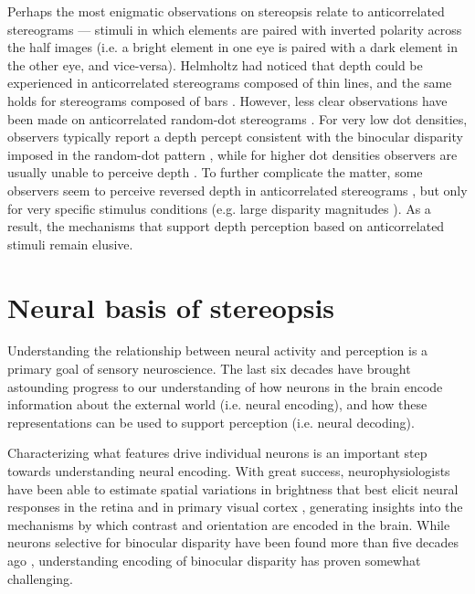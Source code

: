 Perhaps the most enigmatic observations on stereopsis relate to anticorrelated stereograms --- stimuli in which elements are paired with inverted polarity across the half images (i.e. a bright element in one eye is paired with a dark element in the other eye, and vice-versa). Helmholtz had noticed that depth could be experienced in anticorrelated stereograms composed of thin lines, and the same holds for stereograms composed of bars \cite{Cumming:1998ib}. However, less clear observations have been made on anticorrelated random-dot stereograms \cite{Cogan:1993yr, Cumming:1998ib, Tanabe:2008gx, Doi:2011ku, Hibbard2014}. For very low dot densities, observers typically report a depth percept consistent with the binocular disparity imposed in the random-dot pattern \cite{Cogan:1993yr, Cumming:1998ib}, while for higher dot densities observers are usually unable to perceive depth \cite{JULESZ:1964ff, Hibbard2014}. To further complicate the matter, some observers seem to perceive reversed depth in anticorrelated stereograms \cite{Tanabe:2008gx, Doi:2011ku,Read:2000kx}, but only for very specific stimulus conditions (e.g. large disparity magnitudes \cite{Doi:2011ku}). As a result, the mechanisms that support depth perception based on anticorrelated stimuli remain elusive.


\section{Neural basis of stereopsis}  

Understanding the relationship between neural activity and perception is a primary goal of sensory neuroscience. The last six decades have brought astounding progress to our understanding of how neurons in the brain encode information about the external world (i.e. neural encoding), and how these representations can be used to support perception (i.e. neural decoding). 

Characterizing what features drive individual neurons is an important step towards understanding neural encoding. With great success, neurophysiologists have been able to estimate spatial variations in brightness that best elicit neural responses in the retina \cite{Lettvin:1959gs,Levick:1967fk,Barlow:1972bh} and in primary visual cortex \cite{HUBEL:1959tz, HUBEL:1962ti, Hubel:1968hz}, generating insights into the mechanisms by which contrast and orientation are encoded in the brain. While neurons selective for binocular disparity have been found more than five decades ago \cite{Barlow:1967bs,Nikara:1968ys,Pettigrew:1968zr}, understanding encoding of binocular disparity has proven somewhat challenging.

